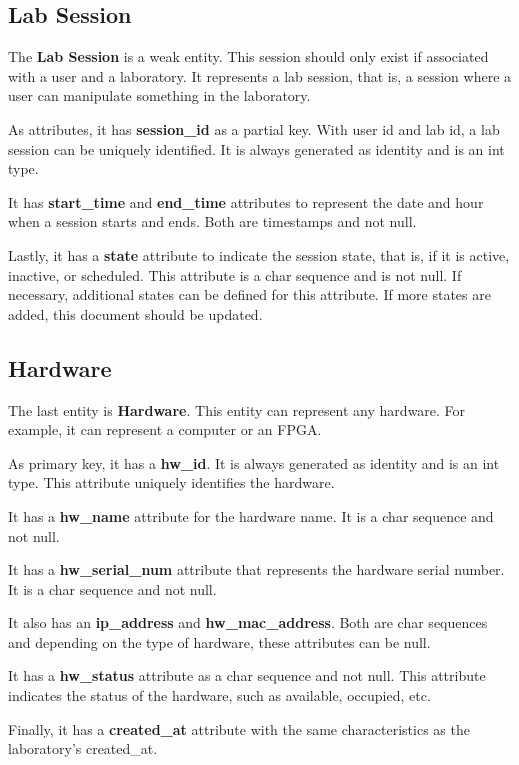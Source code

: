 \documentclass[a4paper,twoside,11pt]{article}
\begin{document}
\subsection*{Lab Session}
The \textbf{Lab Session} is a weak entity. This session should only exist if associated with a user and a laboratory. It represents a lab session, that is, a session where a user can manipulate something in the laboratory.

As attributes, it has \textbf{session\_id} as a partial key. With user id and lab id, a lab session can be uniquely identified. It is always generated as identity and is an int type.

It has \textbf{start\_time} and \textbf{end\_time} attributes to represent the date and hour when a session starts and ends. Both are timestamps and not null.

Lastly, it has a \textbf{state} attribute to indicate the session state, that is, if it is active, inactive, or scheduled. This attribute is a char sequence and is not null. If necessary, additional states can be defined for this attribute. If more states are added, this document should be updated.

\subsection*{Hardware}
The last entity is \textbf{Hardware}. This entity can represent any hardware. For example, it can represent a computer or an FPGA.

As primary key, it has a \textbf{hw\_id}. It is always generated as identity and is an int type. This attribute uniquely identifies the hardware.

It has a \textbf{hw\_name} attribute for the hardware name. It is a char sequence and not null. 

It has a \textbf{hw\_serial\_num} attribute that represents the hardware serial number. It is a char sequence and not null. 

It also has an \textbf{ip\_address} and \textbf{hw\_mac\_address}. Both are char sequences and depending on the type of hardware, these attributes can be null.

It has a \textbf{hw\_status} attribute as a char sequence and not null. This attribute indicates the status of the hardware, such as available, occupied, etc.

Finally, it has a \textbf{created\_at} attribute with the same characteristics as the laboratory's created\_at.
\nocite{*}


\end{document}
